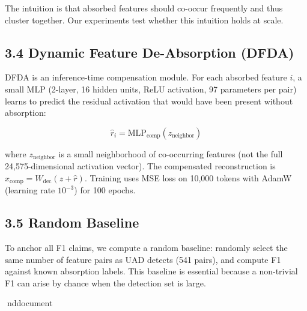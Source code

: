 \documentclass{article}
\begin{document}
The intuition is that absorbed features should co-occur frequently and thus cluster together. Our experiments test whether this intuition holds at scale.

\subsection{3.4 Dynamic Feature De-Absorption (DFDA)}

DFDA is an inference-time compensation module. For each absorbed feature $i$, a small MLP (2-layer, 16 hidden units, ReLU activation, 97 parameters per pair) learns to predict the residual activation that would have been present without absorption:

$$\hat{r}_i = \text{MLP}_{\text{comp}}(z_{\text{neighbor}})$$

where $z_{\text{neighbor}}$ is a small neighborhood of co-occurring features (not the full 24,575-dimensional activation vector). The compensated reconstruction is $\hat{x}_{\text{comp}} = W_{\text{dec}}(z + \hat{r})$. Training uses MSE loss on 10,000 tokens with AdamW (learning rate $10^{-3}$) for 100 epochs.

\subsection{3.5 Random Baseline}

To anchor all F1 claims, we compute a random baseline: randomly select the same number of feature pairs as UAD detects (541 pairs), and compute F1 against known absorption labels. This baseline is essential because a non-trivial F1 can arise by chance when the detection set is large.

nd{document}
\end{document}
